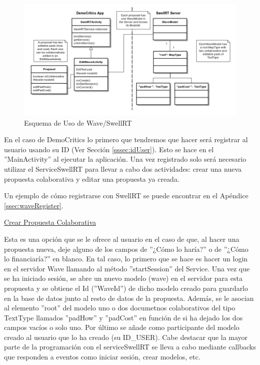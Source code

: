 	\begin{figure}[H]
	  \centering
	    \includegraphics[keepaspectratio, scale=0.5]{Media/Diagrams/collaborativeProposalDiagram.png}
	  \caption{Esquema de Uso de Wave/SwellRT}
	  \label{fig:diagramUseSwellRT}
	\end{figure}	
			
		En el caso de DemoCritics lo primero que tendremos que hacer será registrar al usuario usando su ID (Ver Sección \ref{sssec:idUser}). Esto se hace en el ''MainActivity'' al ejecutar la aplicación.  Una vez registrado solo será necesario utilizar el ServiceSwellRT para llevar a cabo dos actividades: crear una nueva propuesta colaborativa y editar una propuesta ya creada. 
		
		Un ejemplo de cómo registrarse con SwellRT se puede encontrar en el Apéndice \ref{ssec:waveRegister}.

		\underline{Crear Propuesta Colaborativa}
		
		Esta es una opción que se le ofrece al usuario en el caso de que, al hacer una propuesta nueva, deje alguno de los campos de ''¿Cómo lo haría?'' o de ''¿Cómo lo financiaría?'' en blanco. En tal caso, lo primero que se hace es hacer un login en el servidor Wave llamando al método ''startSession'' del Service. Una vez que se ha iniciado sesión, se abre un nuevo modelo (wave) en el servidor para esta propuesta y se obtiene el Id (''WaveId'') de dicho modelo creado para guardarlo en la base de datos junto al resto de datos de la propuesta. Además, se le asocian al elemento ''root'' del modelo uno o dos documetnos colaborativos del tipo TextType llamados ''padHow'' y ''padCost'' en función de si ha dejado los dos campos vacíos o solo uno. Por último se añade como participante del modelo creado al usuario que lo ha creado (su ID\_USER). Cabe destacar que la mayor parte de la programación con el serviceSwellRT se lleva a cabo mediante callbacks que responden a eventos como iniciar sesión, crear modelos, etc.
		
